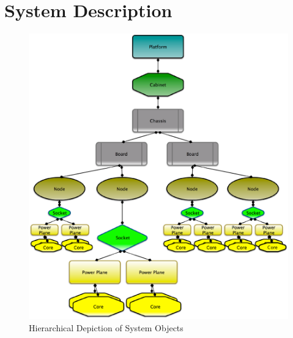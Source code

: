 \section{System Description}\label{sec:PowerAPIBaseSysDesc}

\begin{figure}
	\begin{center}
		\includegraphics[width=0.80\linewidth,height=.60\paperheight]{FIGURES/PowerAPIMachineHierarchy5dot1}
	\end{center}
	\caption{Hierarchical Depiction of System Objects}
	\label{fig:BaseSystemMap}
\end{figure}

